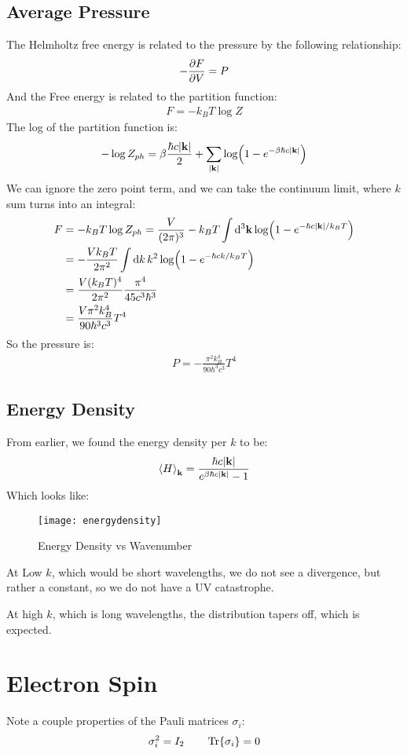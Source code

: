 \documentclass[12pt]{article}
\newcommand{\absk}{\abs{\vb{k}}}
\begin{document}
\subsection{Average Pressure}
The Helmholtz free energy is related to the pressure by the following relationship:
\begin{align*}
  -\pdv{F}{V}=P
\end{align*}
And the Free energy is related to the partition function:
\begin{align*}
  F=-k_BT\log{Z}
\end{align*}
The log of the partition function is:
\begin{align*}
  -\log Z_{ph}=\beta\frac{\hbar c\absk}{2}
  +\sum_{\absk}\log(1-e^{-\beta\hbar c\absk})
\end{align*}
We can ignore the zero point term, and we can take the continuum limit, where $k$ sum turns into an integral:
\begin{align*}
  F&=-k_BT\log Z_{ph}=\frac{V}{(2\pi)^3}
  -k_BT\int\dd[3]{\vb{k}}\log(1-e^{-\hbar c\absk/k_BT})\\
  &=-\frac{Vk_BT}{2\pi^2}\int\dd{k}k^2\log(1-e^{-\hbar ck/k_BT})\\
  &=\frac{V(k_BT)^4}{2\pi^2}\frac{\pi^4}{45c^3\hbar^3}\\
  &=\frac{V\pi^2k_B^4}{90\hbar^3c^3}T^4
\end{align*}
So the pressure is:
\begin{align}
  \boxed{P=-\frac{\pi^2k_B^4}{90\hbar^3c^3}T^4}
\end{align}

\subsection{Energy Density}
From earlier, we found the energy density per $k$ to be:
\begin{align*}
  \ev{H}_{\vb{k}}=\frac{\hbar c\absk}{e^{\beta\hbar c\absk}-1}
\end{align*}
Which looks like:
\begin{figure}[H]
  \centering
  \texttt{[image: energydensity]}
  \caption{Energy Density vs Wavenumber}
\end{figure}
At Low $k$, which would be short wavelengths, we do not see a divergence, but rather a constant, so we do not have a UV catastrophe.

At high $k$, which is long wavelengths, the distribution tapers off, which is expected.

\section{Electron Spin}
Note a couple properties of the Pauli matrices $\sigma_i$:
\begin{align*}
  \sigma_i^2=I_2\qquad\Tr{\sigma_i}=0
\end{align*}
\end{document}

